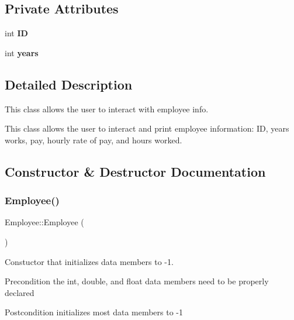 \subsection*{Private Attributes}
\begin{DoxyCompactItemize}
\item 
\mbox{\label{classEmployee_a832bbae4ee8a704b917f82c4d497bbac}} 
int {\bfseries ID}
\item 
\mbox{\label{classEmployee_a3e4862d9dfc73becb459a562fa2e25f5}} 
int {\bfseries years}
\end{DoxyCompactItemize}


\subsection{Detailed Description}
This class allows the user to interact with employee info. 

This class allows the user to interact and print employee information\+: ID, years works, pay, hourly rate of pay, and hours worked. 

\subsection{Constructor \& Destructor Documentation}
\mbox{\label{classEmployee_a003c7bd08c40924e381eb0750cbb906f}} 
\subsubsection{\texorpdfstring{Employee()}{Employee()}\hspace{0.1cm}{\footnotesize\ttfamily [1/2]}}
{\footnotesize\ttfamily Employee\+::\+Employee (\begin{DoxyParamCaption}{ }\end{DoxyParamCaption})}

Constuctor that initializes data members to -\/1.

\begin{DoxyPrecond}{Precondition}
the int, double, and float data members need to be properly declared 
\end{DoxyPrecond}
\begin{DoxyPostcond}{Postcondition}
initializes most data members to -\/1 
\end{DoxyPostcond}
\mbox{\label{classEmployee_ad0c935ef9a290a82dcf7865172c90148}} 
